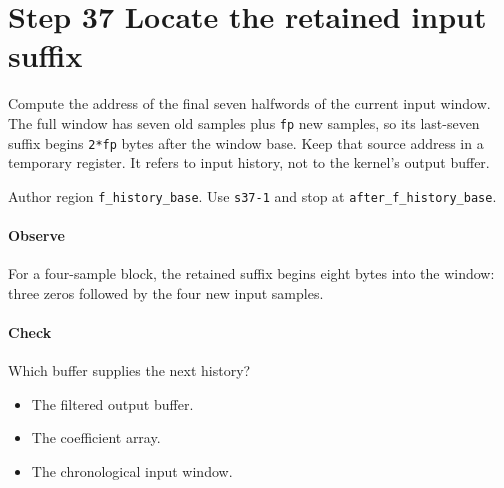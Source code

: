 \section{Step 37 Locate the retained input suffix}\label{pcm-wav-s37}
Compute the address of the final seven halfwords of the current input window. The full window has seven old samples plus \texttt{fp} new samples, so its last-seven suffix begins \texttt{2*fp} bytes after the window base. Keep that source address in a temporary register. It refers to input history, not to the kernel's output buffer.

Author region \texttt{f\_history\_base}. Use \texttt{s37-1} and stop at \texttt{after\_f\_history\_base}.

\paragraph{Observe} For a four-sample block, the retained suffix begins eight bytes into the window: three zeros followed by the four new input samples.

\paragraph{Check} Which buffer supplies the next history?
\begin{itemize}
  \item[A.] The filtered output buffer.
  \item[B.] The coefficient array.
  \item[C.] The chronological input window.
\end{itemize}

